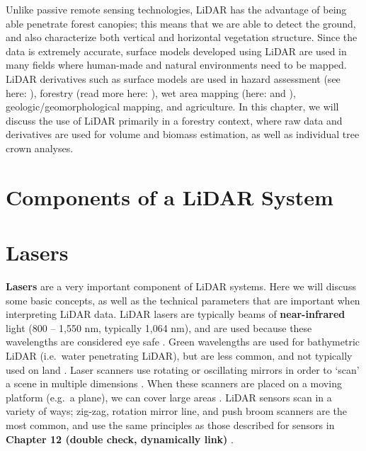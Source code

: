 \documentclass[
]{book}
\begin{document}
Unlike passive remote sensing technologies, LiDAR has the advantage of being able penetrate forest canopies; this means that we are able to detect the ground, and also characterize both vertical and horizontal vegetation structure. Since the data is extremely accurate, surface models developed using LiDAR are used in many fields where human-made and natural environments need to be mapped. LiDAR derivatives such as surface models are used in hazard assessment (see here: \citet{Jaboyedoff2012}), forestry (read more here: \citet{Goodbody2021}), wet area mapping (here: \citet{Eash2018} and \citet{Zurqani2020}), geologic/geomorphological mapping, and agriculture. In this chapter, we will discuss the use of LiDAR primarily in a forestry context, where raw data and derivatives are used for volume and biomass estimation, as well as individual tree crown analyses.

\hypertarget{components-of-a-lidar-system}{%
\section{Components of a LiDAR System}\label{components-of-a-lidar-system}}

\hypertarget{lasers}{%
\section{Lasers}\label{lasers}}

\textbf{Lasers} are a very important component of LiDAR systems. Here we will discuss some basic concepts, as well as the technical parameters that are important when interpreting LiDAR data. LiDAR lasers are typically beams of \textbf{near-infrared} light (800 -- 1,550 nm, typically 1,064 nm), and are used because these wavelengths are considered eye safe \citep{White2013}. Green wavelengths are used for bathymetric LiDAR (i.e.~water penetrating LiDAR), but are less common, and not typically used on land \citep{UFGeomatics-FortLauderdale2016}. Laser scanners use rotating or oscillating mirrors in order to `scan' a scene in multiple dimensions \citep{UFGeomatics-FortLauderdale2016a}. When these scanners are placed on a moving platform (e.g.~a plane), we can cover large areas \citep{UFGeomatics-FortLauderdale2016a}. LiDAR sensors scan in a variety of ways; zig-zag, rotation mirror line, and push broom scanners are the most common, and use the same principles as those described for sensors in \textbf{Chapter 12 (double check, dynamically link)} \citep{UFGeomatics-FortLauderdale2016a}.
\end{document}
